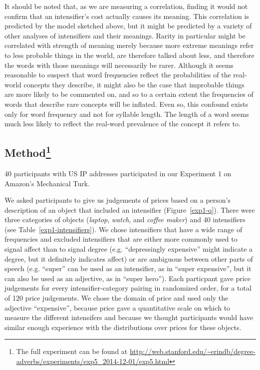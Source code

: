 \documentclass[10pt,letterpaper]{article}
\begin{document}
It should be noted that, as we are measuring a correlation, finding it would not confirm that an intensifier's cost actually causes its meaning. This correlation is predicted by the model sketched above, but it might be predicted by a variety of other analyses of intensifiers and their meanings. Rarity in particular might be correlated with strength of meaning merely because more extreme meanings refer to less probable things in the world, are therefore talked about less, and therefore the words with those meanings will necessarily be rarer. Although it seems reasonable to suspect that word frequencies reflect the probabilities of the real-world concepts they describe, it might also be the case that improbable things are more likely to be commented on, and so to a certain extent the frequencies of words that describe rare concepts will be inflated. Even so, this confound exists only for word frequency and not for syllable length. The length of a word seems much less likely to reflect the real-word prevalence of the concept it refers to.

\subsection{Method\footnote{The full experiment can be found at \url{http://web.stanford.edu/~erindb/degree-adverbs/experiments/exp5_2014-12-01/exp5.html}}}

40 participants with US IP addresses participated in our Experiment 1 on Amazon's Mechanical Turk.

We asked participants to give us judgements of prices based on a person's description of an object that included an intensifier (Figure~\ref{exp1-q}).
There were three categories of objects (\emph{laptop}, \emph{watch}, and \emph{coffee maker}) and 40 intensifiers (see Table~\ref{exp1-intensifiers}).
We chose intensifiers that have a wide range of frequencies and excluded intensifiers that are either more commonly used to signal affect than to signal degree (e.g. ``depressingly expensive'' might indicate a degree, but it definitely indicates affect) or are ambiguous between other parts of speech (e.g. ``super'' can be used as an intensifier, as in ``super expensive'', but it can also be used as an adjective, as in ``super hero'').
Each particpant gave price judgements for every intensifier-category pairing in randomized order, for a total of 120 price judgements.
We chose the domain of price and used only the adjective ``expensive'', because price gave a quantitative scale on which to measure the different intensifers and because we thought participants would have similar enough experience with the distributions over prices for these objects.
\end{document}
